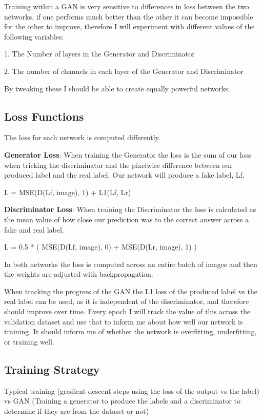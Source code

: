 \documentclass{UoYCSproject}
\begin{document}
Training within a GAN is very sensitive to differences in loss between the two networks, if one performs much better than the other it can become impossible for the other to improve, therefore I will experiment with different values of the following variables:

1. The Number of layers in the Generator and Discriminator

2. The number of channels in each layer of the Generator and Discriminator

By tweaking these I should be able to create equally powerful networks. 

\subsection{Loss Functions}

The loss for each network is computed differently.

\textbf{Generator Loss}: When training the Generator the loss is the sum of our loss when tricking the discriminator and the pixelwise difference between our produced label and the real label. Our network will produce a fake label, Lf. 

L = MSE(D(Lf, image), 1) + L1(Lf, Lr) 

\textbf{Discriminator Loss}: When training the Discriminator the loss is calculated as the mean value of how close our prediction was to the correct answer across a fake and real label.

L = 0.5 * ( MSE(D(Lf, image), 0) + MSE(D(Lr, image), 1) ) 

In both networks the loss is computed across an entire batch of images and then the weights are adjusted with backpropagation.

When tracking the progress of the GAN the L1 loss of the produced label vs the real label can be used, as it is independent of the discriminator, and therefore should improve over time. Every epoch I will track the value of this across the validation dataset and use that to inform me about how well our network is training. It should inform me of whether the network is overfitting, underfitting, or training well. 

\subsection{Training Strategy}

Typical training (gradient descent steps using the loss of the output vs the label) vs GAN (Training a generator to produce the labels and a discriminator to determine if they are from the dataset or not)
\end{document}
